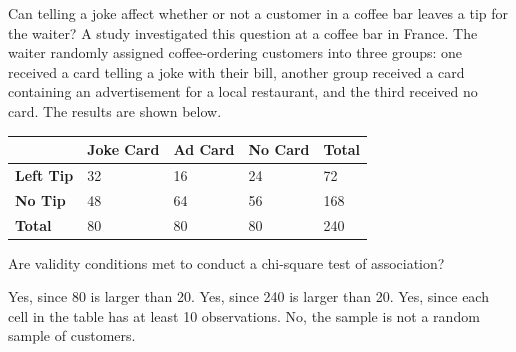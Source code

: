 \documentclass{article}
\begin{document}
\begin{mcquestions}
		
		
		\question Can telling a joke affect whether or not a customer in a coffee bar leaves a tip for the waiter? A study investigated this question at a coffee bar in France. The waiter randomly assigned coffee-ordering customers into three groups: one received a card telling a joke with their bill, another group received a card containing an advertisement for a local restaurant, and the third received no card. The results are shown below.
		\begin{center}
			\begin{tabular}{| l | l | l | l | l |}
				\hline
				& \textbf{Joke Card} & \textbf{Ad Card} & \textbf{No Card} & \textbf{Total} \\
				\hline
				\textbf{Left Tip} & 32 & 16 & 24 & 72 \\
				\hline
				\textbf{No Tip} & 48 & 64 & 56 & 168 \\
				\hline
				\textbf{Total} & 80 & 80 & 80 & 240 \\
				\hline
			\end{tabular}
		\end{center}
		Are validity conditions met to conduct a chi-square test of association?
		\begin{mcanswerslist}
			\answer Yes, since 80 is larger than 20.
			\answer Yes, since 240 is larger than 20.
			\answer[correct] Yes, since each cell in the table has at least 10 observations.
			\answer No, the sample is not a random sample of customers.
		\end{mcanswerslist}
		
		
	\end{mcquestions}
\end{document}
